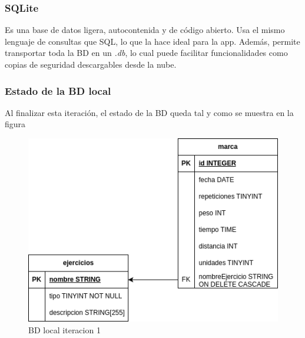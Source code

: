 \subsubsection{SQLite}  %
Es una base de datos ligera, autocontenida y de c\'odigo abierto. Usa el mismo lenguaje de consultas que SQL, lo que la hace ideal para la app. Adem\'as, permite transportar toda la BD en un \textit{.db}, lo cual puede facilitar funcionalidades como copias de seguridad descargables desde la nube.


\subsubsection{Estado de la BD local}
Al finalizar esta iteración, el estado de la BD queda tal y como se muestra en la figura %
\begin{figure}[H]
   \centering
    \includegraphics[width=\textwidth]{fotos/BDL iteracion 1.png}
    \caption{BD local iteracion 1}
    \label{fig:BD local iteracion 1}
\end{figure}

